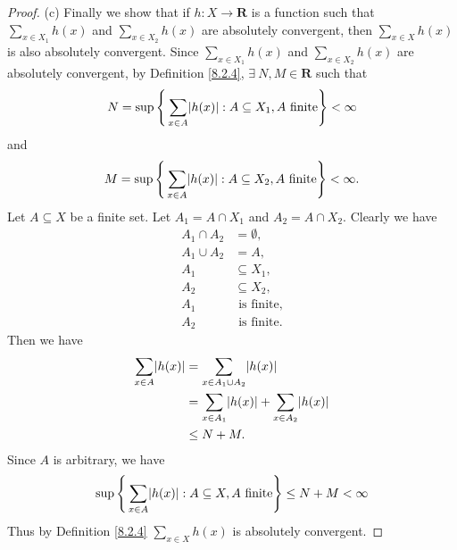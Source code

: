 \begin{proof}{(c)}
    Finally we show that if \(h : X \to \mathbf{R}\) is a function such that \(\sum_{x \in X_1} h(x)\) and \(\sum_{x \in X_2} h(x)\) are absolutely convergent, then \(\sum_{x \in X} h(x)\) is also absolutely convergent.
    Since \(\sum_{x \in X_1} h(x)\) and \(\sum_{x \in X_2} h(x)\) are absolutely convergent, by Definition \ref{8.2.4}, \(\exists\ N, M \in \mathbf{R}\) such that
    \[
        N = \sup\Bigg\{\sum_{x \in A} \abs*{h(x)} : A \subseteq X_1, A \text{ finite}\Bigg\} < \infty
    \]
    and
    \[
        M = \sup\Bigg\{\sum_{x \in A} \abs*{h(x)} : A \subseteq X_2, A \text{ finite}\Bigg\} < \infty.
    \]
    Let \(A \subseteq X\) be a finite set.
    Let \(A_1 = A \cap X_1\) and \(A_2 = A \cap X_2\).
    Clearly we have
    \begin{align*}
        A_1 \cap A_2 & = \emptyset, \\
        A_1 \cup A_2 & = A, \\
        A_1 & \subseteq X_1, \\
        A_2 & \subseteq X_2, \\
        A_1 & \text{ is finite}, \\
        A_2 & \text{ is finite}.
    \end{align*}
    Then we have
    \begin{align*}
         \sum_{x \in A} \abs*{h(x)} & = \sum_{x \in A_1 \cup A_2} \abs*{h(x)} \\
         & = \sum_{x \in A_1} \abs*{h(x)} + \sum_{x \in A_2} \abs*{h(x)} \\
         & \leq N + M.
    \end{align*}
    Since \(A\) is arbitrary, we have
    \[
        \sup\Bigg\{\sum_{x \in A} \abs*{h(x)} : A \subseteq X, A \text{ finite}\Bigg\} \leq N + M < \infty
    \]
    Thus by Definition \ref{8.2.4} \(\sum_{x \in X} h(x)\) is absolutely convergent.
\end{proof}

